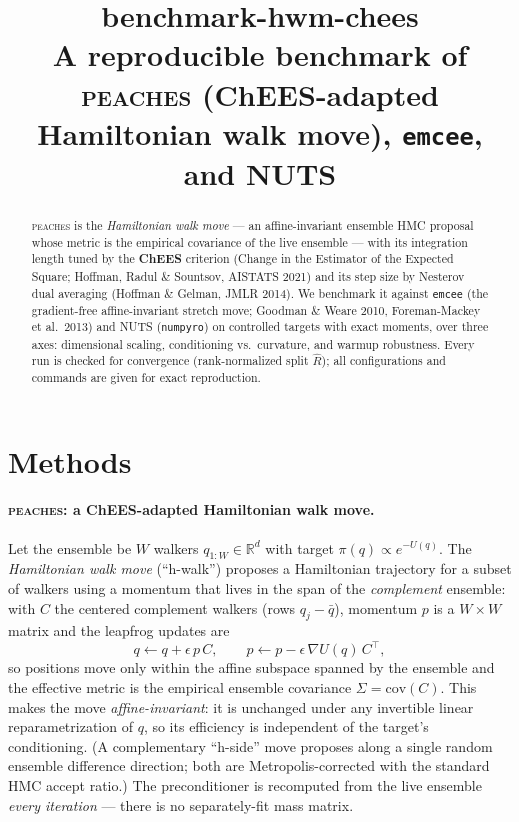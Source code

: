 \documentclass[11pt]{article}
\title{\textbf{benchmark-hwm-chees}\\[2pt]
\large A reproducible benchmark of \textsc{peaches} (ChEES-adapted Hamiltonian
walk move), \texttt{emcee}, and NUTS}
\author{}
\date{}
\begin{document}
\maketitle

\begin{abstract}
\noindent
\textsc{peaches} is the \emph{Hamiltonian walk move} --- an affine-invariant
ensemble HMC proposal whose metric is the empirical covariance of the live
ensemble --- with its integration length tuned by the \textbf{ChEES} criterion
(Change in the Estimator of the Expected Square; Hoffman, Radul \& Sountsov,
AISTATS 2021) and its step size by Nesterov dual averaging (Hoffman \& Gelman,
JMLR 2014). We benchmark it against \texttt{emcee} (the gradient-free
affine-invariant stretch move; Goodman \& Weare 2010, Foreman-Mackey et al.\
2013) and NUTS (\texttt{numpyro}) on controlled targets with exact moments, over
three axes: dimensional scaling, conditioning vs.\ curvature, and warmup
robustness. Every run is checked for convergence (rank-normalized split
$\hat R$); all configurations and commands are given for exact reproduction.
\end{abstract}

\section{Methods}\label{sec:methods}

\paragraph{\textsc{peaches}: a ChEES-adapted Hamiltonian walk move.}
Let the ensemble be $W$ walkers $q_{1:W}\in\mathbb{R}^d$ with target
$\pi(q)\propto e^{-U(q)}$. The \emph{Hamiltonian walk move} (``h-walk'')
proposes a Hamiltonian trajectory for a subset of walkers using a momentum that
lives in the span of the \emph{complement} ensemble: with $C$ the centered
complement walkers (rows $q_j-\bar q$), momentum $p$ is a $W\!\times\!W$ matrix
and the leapfrog updates are
\[
q \leftarrow q + \epsilon\, p\,C,\qquad
p \leftarrow p - \epsilon\, \nabla U(q)\,C^{\!\top},
\]
so positions move only within the affine subspace spanned by the ensemble and
the effective metric is the empirical ensemble covariance
$\Sigma=\mathrm{cov}(C)$. This makes the move \emph{affine-invariant}: it is
unchanged under any invertible linear reparametrization of $q$, so its
efficiency is independent of the target's conditioning. (A complementary
``h-side'' move proposes along a single random ensemble difference direction;
both are Metropolis-corrected with the standard HMC accept ratio.) The
preconditioner is recomputed from the live ensemble \emph{every iteration} ---
there is no separately-fit mass matrix.
\end{document}
